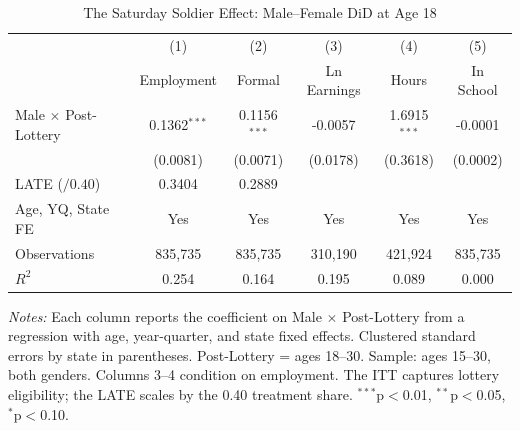 \begin{table}[t]
\centering
\caption{The Saturday Soldier Effect: Male--Female DiD at Age 18}
\label{tab:main}
\small
\begin{tabular}{lccccc}
\toprule
 & (1) & (2) & (3) & (4) & (5) \\
 & Employment & Formal & Ln Earnings & Hours & In School \\
\midrule
Male $\times$ Post-Lottery & 0.1362$^{***}$ & 0.1156$^{***}$ & -0.0057 & 1.6915$^{***}$ & -0.0001 \\
 & (0.0081) & (0.0071) & (0.0178) & (0.3618) & (0.0002) \\[6pt]
LATE ($/0.40$) & 0.3404 & 0.2889 & & & \\
\midrule
Age, YQ, State FE & Yes & Yes & Yes & Yes & Yes \\
Observations & 835,735 & 835,735 & 310,190 & 421,924 & 835,735 \\
$R^2$ & 0.254 & 0.164 & 0.195 & 0.089 & 0.000 \\
\bottomrule
\end{tabular}
\begin{tablenotes}
\footnotesize
\item \textit{Notes:} Each column reports the coefficient on Male $\times$ Post-Lottery from a regression with age, year-quarter, and state fixed effects. Clustered standard errors by state in parentheses. Post-Lottery = ages 18--30. Sample: ages 15--30, both genders. Columns 3--4 condition on employment. The ITT captures lottery eligibility; the LATE scales by the 0.40 treatment share. $^{***}$p$<$0.01, $^{**}$p$<$0.05, $^{*}$p$<$0.10.
\end{tablenotes}
\end{table}
